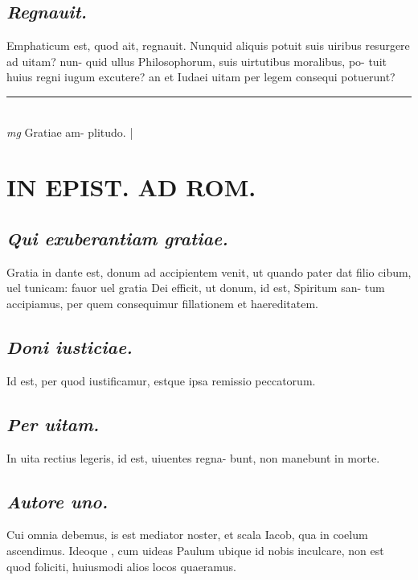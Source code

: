 \documentclass{article}
\begin{document}
\begin{pages}
\subsection*{\textit{Regnauit. }}\pstart Emphaticum est, quod ait, regnauit. Nunquid aliquis potuit suis uiribus resurgere ad uitam? nun- quid ullus Philosophorum, suis uirtutibus moralibus, po- tuit huius regni iugum excutere? an et Iudaei uitam per legem consequi potuerunt?  \pend
\vspace{0.5cm}\noindent
\vspace{0.2cm}\rule{1cm}{0.2pt}\\ 
\hspace{0.2cm}\textit{mg}
\footnotesize Gratiae am- plitudo. 
\normalsize| 
\section*{IN EPIST. AD ROM.  }
\marginpar{[ p.55 ]}
{}
\subsection*{\textit{Qui exuberantiam gratiae. }}\pstart Gratia in dante est, donum ad accipientem venit, ut quando pater dat filio cibum, uel tunicam: fauor uel gratia Dei efficit, ut donum, id est, Spiritum san- tum accipiamus, per quem consequimur fillationem et haereditatem.   \pend
{}
{}
\subsection*{\textit{Doni iusticiae. }}\pstart Id est, per quod iustificamur, estque ipsa remissio peccatorum.   \pend
{}
{}
\subsection*{\textit{Per uitam. }}\pstart In uita rectius legeris, id est, uiuentes regna- bunt, non manebunt in morte.   \pend
{}
{}
\subsection*{\textit{Autore uno. }}\pstart Cui omnia debemus, is est mediator noster, et scala Iacob, qua in coelum ascendimus. Ideoque , cum uideas Paulum ubique id nobis inculcare, non est quod foliciti, huiusmodi alios locos quaeramus.   \pend
{}
{}

\end{pages}
\end{document}
